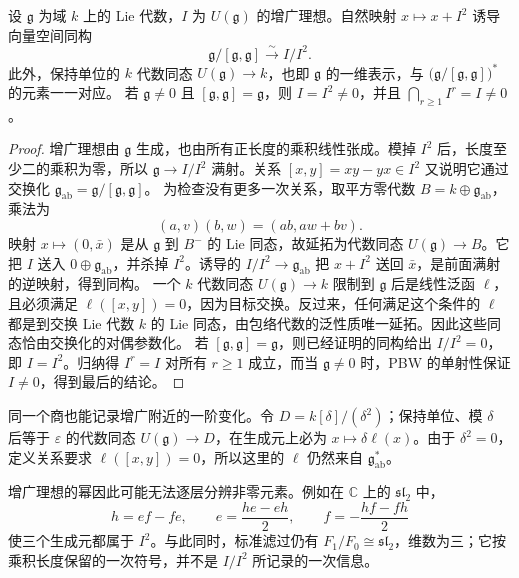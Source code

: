 \begin{proposition}\label{b5:prop:enveloping-augmentation-cotangent}
	设 \(\mathfrak g\) 为域 \(k\) 上的 Lie 代数，\(I\) 为 \(U(\mathfrak g)\) 的增广理想。自然映射 \(x\mapsto x+I^2\) 诱导向量空间同构
	\[
		\mathfrak g/[\mathfrak g,\mathfrak g]\xrightarrow{\sim} I/I^2.
	\]
	此外，保持单位的 \(k\) 代数同态 \(U(\mathfrak g)\to k\)，也即 \(\mathfrak g\) 的一维表示，与 \(\bigl(\mathfrak g/[\mathfrak g,\mathfrak g]\bigr)^*\) 的元素一一对应。 若 \(\mathfrak g\ne0\) 且 \([\mathfrak g,\mathfrak g]=\mathfrak g\)，则 \(I=I^2\ne0\)，并且 \(\bigcap_{r\ge1}I^r=I\ne0\)。
\end{proposition}
\begin{proof}
	增广理想由 \(\mathfrak g\) 生成，也由所有正长度的乘积线性张成。模掉 \(I^2\) 后，长度至少二的乘积为零，所以 \(\mathfrak g\to I/I^2\) 满射。关系 \([x,y]=xy-yx\in I^2\) 又说明它通过交换化 \(\mathfrak g_{\mathrm{ab}}=\mathfrak g/[\mathfrak g,\mathfrak g]\)。 为检查没有更多一次关系，取平方零代数 \(B=k\oplus\mathfrak g_{\mathrm{ab}}\)，乘法为
	\[
		(a,v)(b,w)=(ab,aw+bv).
	\]
	映射 \(x\mapsto(0,\bar x)\) 是从 \(\mathfrak g\) 到 \(B^-\) 的 Lie 同态，故延拓为代数同态 \(U(\mathfrak g)\to B\)。它把 \(I\) 送入 \(0\oplus\mathfrak g_{\mathrm{ab}}\)，并杀掉 \(I^2\)。诱导的 \(I/I^2\to\mathfrak g_{\mathrm{ab}}\) 把 \(x+I^2\) 送回 \(\bar x\)，是前面满射的逆映射，得到同构。 一个 \(k\) 代数同态 \(U(\mathfrak g)\to k\) 限制到 \(\mathfrak g\) 后是线性泛函 \(\ell\)，且必须满足 \(\ell([x,y])=0\)，因为目标交换。反过来，任何满足这个条件的 \(\ell\) 都是到交换 Lie 代数 \(k\) 的 Lie 同态，由包络代数的泛性质唯一延拓。因此这些同态恰由交换化的对偶参数化。 若 \([\mathfrak g,\mathfrak g]=\mathfrak g\)，则已经证明的同构给出 \(I/I^2=0\)，即 \(I=I^2\)。归纳得 \(I^r=I\) 对所有 \(r\ge1\) 成立，而当 \(\mathfrak g\ne0\) 时，PBW 的单射性保证 \(I\ne0\)，得到最后的结论。
\end{proof}
同一个商也能记录增广附近的一阶变化。令 \(D=k[\delta]/(\delta^2)\)；保持单位、模 \(\delta\) 后等于 \(\varepsilon\) 的代数同态 \(U(\mathfrak g)\to D\)，在生成元上必为 \(x\mapsto\delta\ell(x)\)。由于 \(\delta^2=0\)，定义关系要求 \(\ell([x,y])=0\)，所以这里的 \(\ell\) 仍然来自 \(\mathfrak g_{\mathrm{ab}}^*\)。

\ProseParagraphBreak

增广理想的幂因此可能无法逐层分辨非零元素。例如在 \(\mathbb C\) 上的 \(\mathfrak{sl}_2\) 中，
\[
	h=ef-fe,\qquad e=\frac{he-eh}{2},\qquad f=-\frac{hf-fh}{2}
\]
使三个生成元都属于 \(I^2\)。与此同时，标准滤过仍有 \(F_1/F_0\cong\mathfrak{sl}_2\)，维数为三；它按乘积长度保留的一次符号，并不是 \(I/I^2\) 所记录的一次信息。

